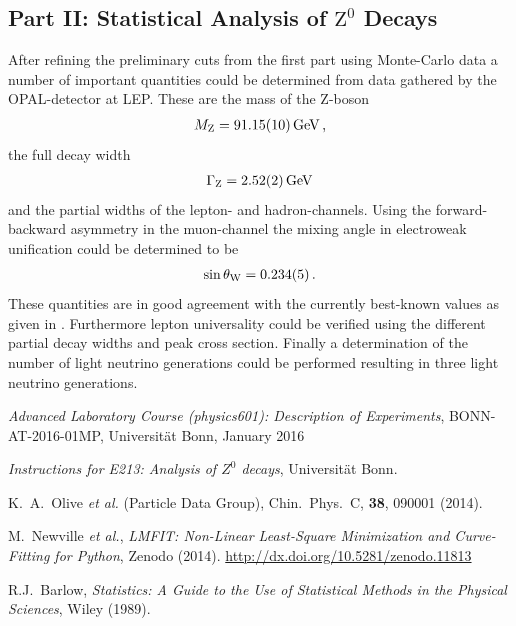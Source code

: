 \documentclass[11pt, a4paper]{article}
\numberwithin{equation}{section}
\begin{document}
\subsection{Part II: Statistical Analysis of $\mathrm{Z}^0$ Decays}
After refining the preliminary cuts from the first part using Monte-Carlo data a number of important quantities could be determined from data gathered by the OPAL-detector at LEP.
These are the mass of the Z-boson
\begin{align*}
	M_\mathrm{Z} = \SI{91.15 +- 0.10}{GeV} \,\text{,}
\end{align*}
the full decay width
\begin{align*}
	\Gamma_\mathrm{Z} = \SI{2.52 +- 0.02}{GeV}
\end{align*}
and the partial widths of the lepton- and hadron-channels.
Using the forward-backward asymmetry in the muon-channel the mixing angle in electroweak unification could be determined to be
\begin{align*}
	\sin\theta_\mathrm{W} = \num{0.234 +- 0.005} \,\text{.}
\end{align*}
These quantities are in good agreement with the currently best-known values as given in \cite{pdg}.
Furthermore lepton universality could be verified using the different partial decay widths and peak cross section.
Finally a determination of the number of light neutrino generations could be performed resulting in three light neutrino generations.

\FloatBarrier
\vspace{\fill}
\begin{thebibliography}{19}
	\emph{Advanced Laboratory Course (physics601): Description of Experiments}, BONN-AT-2016-01MP, Universität Bonn, January 2016

	\emph{Instructions for E213: Analysis of $Z^0$ decays},
	Universität Bonn.
	
	K.\ A.\ Olive \textit{et al.} (Particle Data Group),
	Chin.\ Phys.\ C, \textbf{38}, 090001 (2014).

	M.\ Newville \textit{et al.},
	\emph{LMFIT: Non-Linear Least-Square Minimization and Curve-Fitting for Python}, Zenodo (2014). \url{http://dx.doi.org/10.5281/zenodo.11813}

	R.J.\ Barlow,
	\emph{Statistics: A Guide to the Use of Statistical Methods in the Physical Sciences},
	Wiley (1989).
	
\end{thebibliography}
\end{document}
